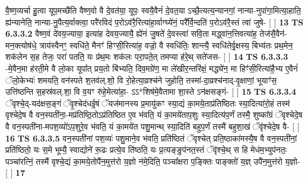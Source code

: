 \documentclass[17pt]{extarticle}
\begin{document}
                  वै॒ष्ण॒व्यर्चा हु॒त्वा यूप॒मच्छै॑ति वैष्ण॒वो वै दे॒वत॑या॒ यूपः॒ स्वयै॒वैनं॑ दे॒वत॒या ऽच्छै॒त्यत्य॒न्यानगां॒ नान्या-नुपा॑गा॒मित्या॒हाति॒ ह्य॑न्यानेति॒ नान्या-नु॒पैत्य॒र्वाक्त्वा॒ परै॑रविदं प॒रोऽव॑रै॒रित्या॑हा॒र्वाग्घ्ये॑नं॒ परै᳚र्वि॒न्दति॑ प॒रोऽव॑रै॒स्तं त्वा॑ जुषे- [  ] \textbf{  13} \newline
                  \newline
                                \textbf{ TS 6.3.3.2} \newline
                  वैष्ण॒वं दे॑वय॒ज्याया॒ इत्या॑ह देवय॒ज्यायै॒ ह्ये॑नं जु॒षते॑ दे॒वस्त्वा॑ सवि॒ता मद्ध्वा॑न॒त्तिवत्या॑ह॒ तेज॑सै॒वैन॑-मन॒क्त्योष॑धे॒ त्राय॑स्वैनꣳ॒॒ स्वधि॑ते॒ मैनꣳ॑ हिꣳसी॒रित्या॑ह॒ वज्रो॒ वै स्वधि॑तिः॒ शान्त्यै॒ स्वधि॑तेर्वृ॒क्षस्य॒ बिभ्य॑तः प्रथ॒मेन॒ शक॑लेन स॒ह तेजः॒ परा॑ पतति॒ यः प्र॑थ॒मः शक॑लः परा॒पते॒त् तमप्या ह॑रे॒थ् सते॑जस- [  ] \textbf{  14} \newline
                  \newline
                                \textbf{ TS 6.3.3.3} \newline
                  -मे॒वैन॒मा ह॑रती॒मे वै लो॒का यूपा᳚त् प्रय॒तो बि॑भ्यति॒ दिव॒मग्रे॑ण॒ मा ले॑खीर॒न्तरि॑क्षं॒ मद्ध्ये॑न॒ मा हिꣳ॑सी॒रित्या॑है॒भ्य ए॒वैनं॑ ॅलो॒केभ्यः॑ शमयति॒ वन॑स्पते श॒तव॑ल्.शो॒ वि रो॒हेत्या॒व्रश्च॑ने जुहोति॒ तस्मा॑-दा॒व्रश्च॑नाद्-वृ॒क्षाणां॒ भूयाꣳ॑स॒ उत्ति॑ष्ठन्ति स॒हस्र॑वल्.शा॒ वि व॒यꣳ रु॑हे॒मेत्या॑हा॒- ऽऽ*शिष॑मे॒वैतामा शा॒स्ते ऽन॑क्षसङ्गं- [  ] \textbf{  15} \newline
                  \newline
                                \textbf{ TS 6.3.3.4} \newline
                  ॅवृश्चे॒द्-यद॑क्षस॒ङ्गं ॅवृ॒श्चेद॑धई॒षं ॅयज॑मानस्य प्र॒मायु॑कꣳ स्या॒द्यं का॒मये॒ताप्र॑तिष्ठितः स्या॒दित्या॑रो॒हं तस्म॑ वृश्चेदे॒ष वै वन॒स्पती॑ना॒-मप्र॑तिष्ठि॒तोऽप्र॑तिष्ठित ए॒व भ॑वति॒ यं का॒मये॑ताप॒शुः स्या॒दित्य॑प॒र्णं तस्मै॒ शुष्का᳚ग्रं ॅवृश्चेदे॒ष वै वन॒स्पती॑ना-मपश॒व्यो॑ऽप॒शुरे॒व भ॑वति॒ यं का॒मये॑त पशु॒मान्थ् स्या॒दिति॑ बहुप॒र्णं तस्मै॑ बहुशा॒खं ॅवृ॑श्चेदे॒ष वै- [  ] \textbf{  16} \newline
                  \newline
                                \textbf{ TS 6.3.3.5} \newline
                  वन॒स्पती॑नां पश॒व्यः॑ पशु॒माने॒व भ॑वति॒ प्रति॑ष्ठितं ॅवृश्चेत् प्रति॒ष्ठाका॑मस्यै॒ष वै वन॒स्पती॑नां॒ प्रति॑ष्ठितो॒ यः स॒मे भूम्यै॒ स्वाद्योने॑ रू॒ढः प्रत्ये॒व ति॑ष्ठति॒ यः प्र॒त्यङ्ङुप॑नत॒स्तं ॅवृ॑श्चे॒थ् स हि मेध॑म॒भ्युप॑नतः॒ पञ्चा॑रत्निं॒ तस्मै॑ वृश्चे॒द्यं का॒मये॒तोपै॑न॒मुत्त॑रो य॒ज्ञो न॑मे॒दिति॒ पञ्चा᳚क्षरा प॒ङ्क्तिः पाङ्क्तो॑ य॒ज्ञ् उपै॑न॒मुत्त॑रो य॒ज्ञो- [  ] \textbf{  17} \newline
\end{document}
